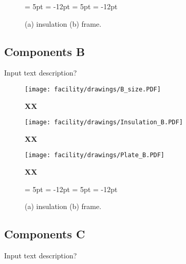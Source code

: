 \begin{figure}[h!]
  \begin{center}
  {\subfigcapskip = 5pt \subfigcapmargin = -12pt }
   {\subfigcapskip = 5pt \subfigcapmargin = -12pt  }
  \end{center}
\caption{(a) insulation (b) frame. } 
\end{figure}


\clearpage
\subsection{Components B}
Input text description?\\

\begin{figure}[h!]
\centering
\texttt{[image: facility/drawings/B\_size.PDF]}
\caption{\footnotesize {\bf XX} } 
\end{figure}

\begin{figure}[h!]
\centering
\texttt{[image: facility/drawings/Insulation\_B.PDF]}
\caption{\footnotesize {\bf XX} } 
\end{figure}

\begin{figure}[h!]
\centering
\texttt{[image: facility/drawings/Plate\_B.PDF]}
\caption{\footnotesize {\bf XX} } 
\end{figure}

\begin{figure}[h!]
  \begin{center}
  {\subfigcapskip = 5pt \subfigcapmargin = -12pt }
   {\subfigcapskip = 5pt \subfigcapmargin = -12pt  }
  \end{center}
\caption{(a) insulation (b) frame. } 
\end{figure}


\clearpage
\subsection{Components C}
Input text description?\\

